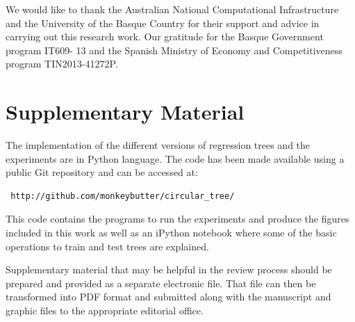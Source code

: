 \documentclass[times,twocolumn,final,authoryear]{elsarticle}
\begin{document}
We would like to thank the Australian National Computational Infrastructure and the University of the Basque Country for their support and advice in carrying out this research work.
Our gratitude for the Basque Government program IT609- 13 and the Spanish Ministry of Economy and Competitiveness program TIN2013-41272P.






\section*{Supplementary Material}

The implementation of the different versions of regression trees and the experiments are in Python language. The code has been made available using a public Git repository and can be accessed at:

\begin{verbatim}
 http://github.com/monkeybutter/circular_tree/
\end{verbatim}

This code contains the programs to run the experiments and produce the figures included in this work as well as an iPython notebook where some of the basic operations to train and test trees are explained.

Supplementary material that may be helpful in the review process should be prepared and provided as a separate electronic file. That file can then be transformed into PDF format and submitted along with the manuscript and graphic files to the appropriate editorial office.
\end{document}
